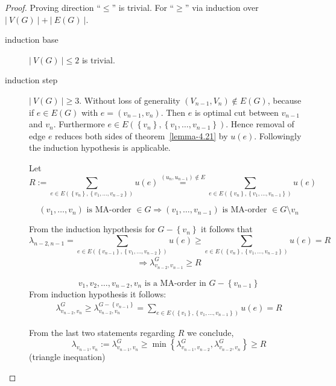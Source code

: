 \documentclass{article}
\newcommand{\card}[1]{\left|\:\!#1\:\!\right|}
\newcommand{\set}[1]{\left\{#1\right\}}
\begin{document}
\begin{proof}
  Proving direction ``$\leq$'' is trivial. For ``$\geq$'' via induction over $\card{V(G)} + \card{E(G)}$.
  \begin{description}
    \item[induction base] $\card{V(G)} \leq 2$ is trivial.
    \item[induction step]
      $\card{V(G)} \geq 3$. Without loss of generality $(V_{n-1}, V_{n}) \notin E(G)$,
      because if $e \in E(G)$ with $e = (v_{n-1}, v_n)$. Then $e$ is optimal cut between $v_{n-1}$
      and $v_n$. Furthermore $e \in E(\set{v_n}, \set{v_1, \ldots, v_{n-1}})$.
      Hence removal of edge $e$ reduces both sides of theorem~\ref{lemma-4.21} by $u(e)$.
      Followingly the induction hypothesis is applicable.

      Let
      \[
        R := \sum_{e \in E(\set{v_n}, \set{v_1, \ldots, v_{n-2}})} u(e)
          \stackrel{(u_n, u_{n-1}) \notin E}{=}
          \sum_{e \in E(\set{v_n}, \set{v_1, \ldots, v_{n-1}})} u(e)
      \]

      \[
        (v_1, \ldots, v_n) \text{ is MA-order } \in G
          \Rightarrow (v_1, \ldots, v_{n-1}) \text{ is MA-order } \in G \setminus {v_n}
      \]

      From the induction hypothesis for $G - \set{v_n}$ it follows that
      \[
        \lambda_{n-2,n-1} =
          \sum_{e \in E(\set{v_{n-1}}, \set{v_1, \ldots, v_{n-2}})} u(e)
        \geq
          \sum_{e \in E(\set{v_{n}}, \set{v_1, \ldots, v_{n-2}})} u(e)
        = R
      \] \begin{align}
        \Rightarrow \lambda^G_{v_{n-2}, v_{n-1}} \geq R
      \end{align}

      \[
        v_1, v_2, \ldots, v_{n-2}, v_n \text{ is a MA-order in } G-\set{v_{n-1}}
      \]
      From induction hypothesis it follows:
      \begin{align}
        \lambda^G_{v_{n-2},v_n} \geq \lambda^{G - \set{v_{n-1}}}_{v_{n-2}, v_n}
          = \sum_{e \in E(\set{v_1}, \set{v_1, \ldots, v_{n-1}})} u(e) = R
      \end{align}

      From the last two statements regarding $R$ we conclude,
      \[
        \lambda_{v_{n-1},v_n} := \lambda^G_{v_{n-1}, v_n}
          \geq \min{\set{\lambda^G_{v_{n-1}, v_{n-2}}, \lambda^G_{v_{n-2}, v_{n}}}}
          \geq R
      \]
      (triangle inequation)
  \end{description}
\end{proof}
\end{document}

